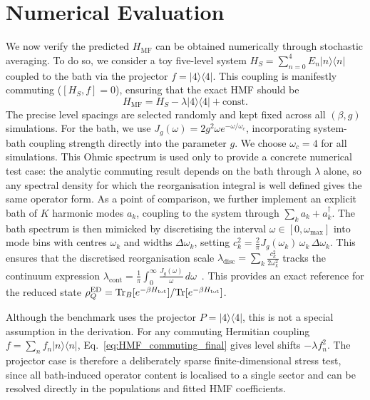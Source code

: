\section{Numerical Evaluation}
\label{sec:numerical}
We now verify the predicted $H_{\mathrm{MF}}$ can be obtained numerically through stochastic averaging. To do so, we consider a toy five-level system $H_S = \sum_{n=0}^4 E_n |n\rangle\langle n|$ coupled to the bath via the projector $f = |4\rangle\langle 4|$. This coupling is manifestly commuting ($[H_S, f] = 0$), ensuring that the exact HMF should be
\begin{equation}
    H_{\mathrm{MF}} = H_S - \lambda |4\rangle\langle 4| + \mathrm{const}.
\end{equation}
The precise level spacings are selected randomly and kept fixed across all $(\beta,g)$ simulations. For the bath, we use $J_g(\omega)=2 g^2\omega e^{-\omega/\omega_c}$, incorporating system-bath coupling strength directly into the parameter $g$. We choose $\omega_c=4$ for all simulations. This Ohmic spectrum is used only to provide a concrete numerical test case: the analytic commuting result depends on the bath through $\lambda$ alone, so any spectral density for which the reorganisation integral is well defined gives the same operator form. As a point of comparison, we further implement an explicit bath of $K$ harmonic modes $a_k$, coupling to the system through $\sum_k a_k +a_k^\dagger$. The bath spectrum is then mimicked by discretising the interval $\omega\in[0, \omega_{\max}]$ into mode bins with centres $\omega_k$ and widths $\Delta\omega_k$, setting $c_k^2=\frac{2}{\pi}J_g(\omega_k)\,\omega_k\,\Delta\omega_k$. This ensures that the discretised reorganisation scale $\lambda_{\mathrm{disc}}=\sum_k\frac{c_k^2}{2\omega_k^2}$ tracks the continuum expression $\lambda_{\mathrm{cont}}=\frac{1}{\pi}\int_0^\infty\frac{J_g(\omega)}{\omega}\,d\omega$~\cite{weissQuantumDissipativeSystems2012}. This provides an exact reference for the reduced state $\rho_Q^{\mathrm{ED}}=\mathrm{Tr}_B[e^{-\beta H_{\mathrm{tot}}}]/\mathrm{Tr}[e^{-\beta H_{\mathrm{tot}}}]$. 

Although the benchmark uses the projector $P=|4\rangle\langle 4|$, this is not a special assumption in the derivation. For any commuting Hermitian coupling $f=\sum_n f_n |n\rangle\langle n|$, Eq.~\eqref{eq:HMF_commuting_final} gives level shifts $-\lambda f_n^2$. The projector case is therefore a deliberately sparse finite-dimensional stress test, since all bath-induced operator content is localised to a single sector and can be resolved directly in the populations and fitted HMF coefficients.

